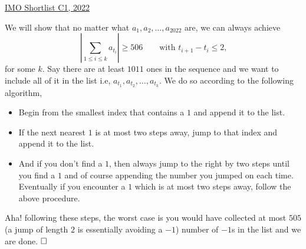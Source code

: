 \begin{problem}{1}{\href{https://artofproblemsolving.com/community/q1h3107334p34892180}{IMO Shortlist C1, 2022}}
\begin{solution}
	 We will show that no matter what $a_1,a_2,\ldots, a_{2022}$ are, we can always achieve
$$\left|\sum_{1\le i\le k}a_{t_i}\right|\ge 506 \qquad\text{with $t_{i+1}-t_i\le 2$,}$$for some $k$. Say there are at least $1011$ ones in the sequence and we want to include all of it in the list i.e, $a_{t_1}, a_{t_2}, \ldots, a_{t_k}.$ We do so according to the following algorithm,
	\begin{itemize}
		\item Begin from the smallest index that contains a $1$ and append it to the list.
		\item If the next nearest $1$ is at most two steps away, jump to that index and append it to the list.
		\item And if you don't find a $1$, then always jump to the right by two steps until you find a $1$ and of course appending the number you jumped on each time. Eventually if you encounter a $1$ which is at most two steps away, follow the above procedure.
	\end{itemize}
	\indent Aha! following these steps, the worst case is you would have collected at most $505$ (a jump of length $2$ is essentially avoiding a $-1$) number of $-1$s in the list and we are done. $\qedwhite$
	\end{solution}
\end{problem}

